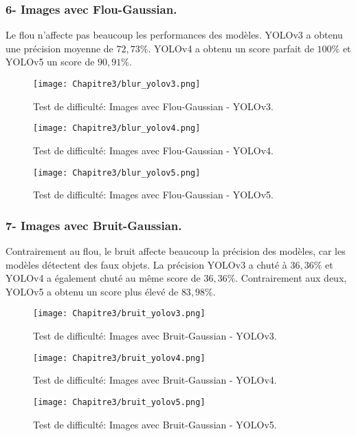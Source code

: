           \subsubsection{6- Images avec Flou-Gaussian.}
          Le flou n'affecte pas beaucoup les performances des modèles. YOLOv3 a obtenu une précision moyenne de $72,73\%$. YOLOv4 a obtenu un score parfait de $100\%$ et YOLOv5 un score de $90,91\%$.
          \begin{figure}[H]
                    \centering
                    \texttt{[image: Chapitre3/blur\_yolov3.png]}
                    \caption{Test de difficulté: Images avec Flou-Gaussian - YOLOv3.}
                    \label{y3_blur}
                    \end{figure}
          \begin{figure}[H]
                    \centering
                    \texttt{[image: Chapitre3/blur\_yolov4.png]}
                    \caption{Test de difficulté: Images avec Flou-Gaussian - YOLOv4.}
                    \label{y4_blur}
                    \end{figure}
          \begin{figure}[H]
                    \centering
                    \texttt{[image: Chapitre3/blur\_yolov5.png]}
                    \caption{Test de difficulté: Images avec Flou-Gaussian - YOLOv5.}
                    \label{y5_blur}
                    \end{figure}

          \subsubsection{7- Images avec Bruit-Gaussian.}
          Contrairement au flou, le bruit affecte beaucoup la précision des modèles, car les modèles détectent des faux objets.
          La précision YOLOv3 a chuté à $36,36\%$ et YOLOv4 a également chuté au même score de $36,36\%$. Contrairement aux deux, YOLOv5 a obtenu un score plus élevé de $83,98\%$.
          \begin{figure}[H]
                    \centering
                    \texttt{[image: Chapitre3/bruit\_yolov3.png]}
                    \caption{Test de difficulté: Images avec Bruit-Gaussian - YOLOv3.}
                    \label{bruit_y3}
                    \end{figure}
          \begin{figure}[H]
                    \centering
                    \texttt{[image: Chapitre3/bruit\_yolov4.png]}
                    \caption{Test de difficulté: Images avec Bruit-Gaussian - YOLOv4.}
                    \label{bruit_y4}
                    \end{figure}
          \begin{figure}[H]
                    \centering
                    \texttt{[image: Chapitre3/bruit\_yolov5.png]}
                    \caption{Test de difficulté: Images avec Bruit-Gaussian - YOLOv5.}
                    \label{bruit_y5}
                    \end{figure}
